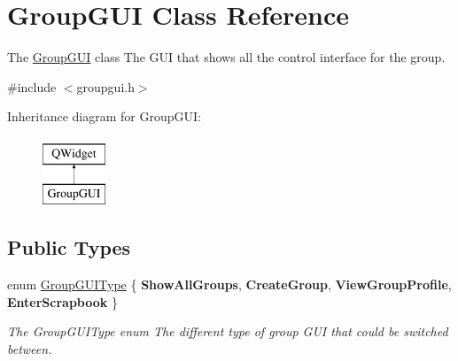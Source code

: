 \hypertarget{classGroupGUI}{}\section{Group\+G\+UI Class Reference}
\label{classGroupGUI}


The \hyperlink{classGroupGUI}{Group\+G\+UI} class The G\+UI that shows all the control interface for the group.  




{\ttfamily \#include $<$groupgui.\+h$>$}

Inheritance diagram for Group\+G\+UI\+:\begin{figure}[H]
\begin{center}
\leavevmode
\includegraphics[height=2.000000cm]{classGroupGUI}
\end{center}
\end{figure}
\subsection*{Public Types}
\begin{DoxyCompactItemize}
\item 
enum \hyperlink{classGroupGUI_a07cb130b553bc270c1debf317cfa1cf8}{Group\+G\+U\+I\+Type} \{ {\bfseries Show\+All\+Groups}, 
{\bfseries Create\+Group}, 
{\bfseries View\+Group\+Profile}, 
{\bfseries Enter\+Scrapbook}
 \}\hypertarget{classGroupGUI_a07cb130b553bc270c1debf317cfa1cf8}{}\label{classGroupGUI_a07cb130b553bc270c1debf317cfa1cf8}
\begin{DoxyCompactList}\small\item\em The Group\+G\+U\+I\+Type enum The different type of group G\+UI that could be switched between. \end{DoxyCompactList}
\end{DoxyCompactItemize}
